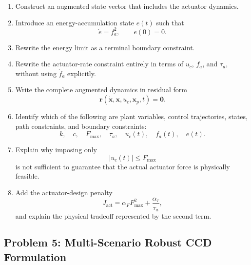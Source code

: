 \begin{enumerate}
    \item Construct an augmented state vector that includes the actuator
    dynamics.

    \item Introduce an energy-accumulation state $e(t)$ such that
    \begin{equation}
    \dot{e}=f_a^2,
    \qquad
    e(0)=0.
    \end{equation}

    \item Rewrite the energy limit as a terminal boundary constraint.

    \item Rewrite the actuator-rate constraint entirely in terms of
    $u_c$, $f_a$, and $\tau_a$, without using $\dot{f}_a$ explicitly.

    \item Write the complete augmented dynamics in residual form
    \begin{equation}
    \mathbf{r}
    \left(
    \dot{\mathbf{x}},
    \mathbf{x},
    u_c,
    \mathbf{x}_p,
    t
    \right)
    =
    \mathbf{0}.
    \end{equation}

    \item Identify which of the following are plant variables, control
    trajectories, states, path constraints, and boundary constraints:
    \begin{equation}
    k,\quad c,\quad F_{\max},\quad \tau_a,\quad
    u_c(t),\quad f_a(t),\quad e(t).
    \end{equation}

    \item Explain why imposing only
    \begin{equation}
    |u_c(t)|\leq F_{\max}
    \end{equation}
    is not sufficient to guarantee that the actual actuator force is
    physically feasible.

    \item Add the actuator-design penalty
    \begin{equation}
    J_{\mathrm{act}}
    =
    \alpha_FF_{\max}^2
    +
    \frac{\alpha_\tau}{\tau_a},
    \end{equation}
    and explain the physical tradeoff represented by the second term.
\end{enumerate}


\subsection*{Problem 5: Multi-Scenario Robust CCD Formulation}

